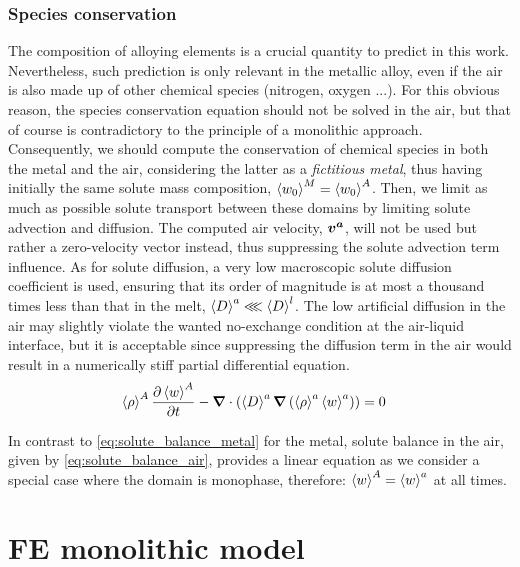 \subsubsection{Species conservation} \label{sec:solute_air}
The composition of alloying elements is a crucial quantity to predict in this work. Nevertheless, such prediction is only relevant
in the metallic alloy, even if the air is also made up of other chemical species (nitrogen, oxygen ...). For this obvious reason,
the species conservation equation should not be solved in the air, but that of course is contradictory to the principle of a monolithic approach.
Consequently, we should compute the conservation of chemical species in both the metal and the air, considering the latter as
a \emph{fictitious metal}, thus having initially the same solute mass composition, $\left \langle {w}_0 \right \rangle^M=\left \langle {w}_0 \right \rangle^A$. 
Then, we limit as much as possible solute transport between these domains by limiting solute advection and diffusion.
The computed air velocity, $\boldsymbol{v^a}$, will not be used but rather a zero-velocity vector instead, thus suppressing the solute advection term influence.
As for solute diffusion, a very low macroscopic solute diffusion 
coefficient is used, ensuring that its order of magnitude is at most 
a thousand times less than that in the melt, $\left \langle D \right \rangle^a \lll \left \langle D \right \rangle^l$.
The low artificial diffusion in the air may slightly violate the wanted 
no-exchange condition at the air-liquid interface, 
but it is acceptable since suppressing the diffusion term in the air would 
result in a numerically stiff partial differential equation.
\begin{align}
  \label{eq:solute_balance_air}
	& \left \langle \rho \right \rangle^A \frac{\partial \left \langle w \right \rangle^A}{\partial t} 
	- \boldsymbol{\nabla} \cdot \left( \left \langle D \right \rangle^a \boldsymbol{\nabla} \left( \left \langle \rho \right \rangle^a \left \langle w \right \rangle^a \right)  \right) = 0
\end{align}

In contrast to \cref{eq:solute_balance_metal} for the metal, solute balance in the air, given by \cref{eq:solute_balance_air}, provides
a linear equation as we consider a special case where the domain is monophase, therefore:  $\left \langle w \right \rangle^A = \left \langle w \right \rangle^a$ at all times.

\section{FE monolithic model}

